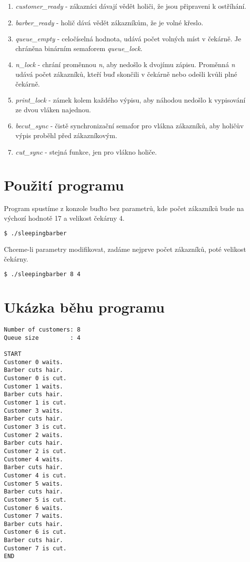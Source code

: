 \documentclass[titlepage]{article}
\begin{document}
\begin{enumerate}
	\item {\em customer\_ready} - zákazníci dávají vědět holiči, že jsou
připraveni k ostříhání.
	\item {\em barber\_ready} - holič dává vědět zákazníkům, že je volné křeslo.
	\item {\em queue\_empty} - celočíselná hodnota, udává počet volných míst v
čekárně. Je chráněna binárním semaforem {\em queue\_lock}.
	\item {\em n\_lock} - chrání proměnnou {\em n}, aby nedošlo k dvojímu
zápisu. Proměnná {\em n} udává počet zákazníků, kteří buď skončili v čekárně
nebo odešli kvůli plné čekárně.
	\item {\em print\_lock} - zámek kolem každého výpisu, aby náhodou nedošlo k
vypisování ze dvou vláken najednou.
	\item {\em becut\_sync} - čistě synchronizační semafor pro vlákna
zákazníků, aby holičův výpis proběhl před zákazníkovým.
	\item {\em cut\_sync} - stejná funkce, jen pro vlákno holiče.
\end{enumerate}

\section{Použití programu}
Program spustíme z konzole buďto bez parametrů, kde počet zákazníků bude na
výchozí hodnotě 17 a velikost čekárny 4.
\begin{verbatim}
$ ./sleepingbarber
\end{verbatim}

Chceme-li parametry modifikovat, zadáme nejprve počet zákazníků, poté velikost
čekárny.
\begin{verbatim}
$ ./sleepingbarber 8 4
\end{verbatim}


\section{Ukázka běhu programu}
\begin{verbatim}
Number of customers: 8
Queue size         : 4

START
Customer 0 waits.
Barber cuts hair.
Customer 0 is cut.
Customer 1 waits.
Barber cuts hair.
Customer 1 is cut.
Customer 3 waits.
Barber cuts hair.
Customer 3 is cut.
Customer 2 waits.
Barber cuts hair.
Customer 2 is cut.
Customer 4 waits.
Barber cuts hair.
Customer 4 is cut.
Customer 5 waits.
Barber cuts hair.
Customer 5 is cut.
Customer 6 waits.
Customer 7 waits.
Barber cuts hair.
Customer 6 is cut.
Barber cuts hair.
Customer 7 is cut.
END
\end{verbatim}
\end{document}
